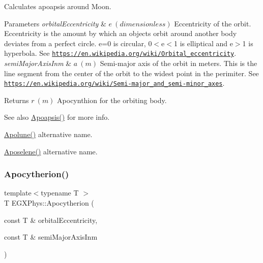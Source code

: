 Calculates apoapsis around Moon. 


\begin{DoxyParams}{Parameters}
{\em orbital\+Eccentricity} & $ e\ (dimensionless)$ Eccentricity of the orbit. Eccentricity is the amount by which an objects orbit around another body deviates from a perfect circle. e=0 is circular, 0$<$e$<$1 is elliptical and e$>$1 is hyperbola. See \href{https://en.wikipedia.org/wiki/Orbital_eccentricity}{\tt https\+://en.\+wikipedia.\+org/wiki/\+Orbital\+\_\+eccentricity}. \\
\hline
{\em semi\+Major\+Axis\+Inm} & $ a\ (m)$ Semi-\/major axis of the orbit in meters. This is the line segment from the center of the orbit to the widest point in the perimiter. See \href{https://en.wikipedia.org/wiki/Semi-major_and_semi-minor_axes}{\tt https\+://en.\+wikipedia.\+org/wiki/\+Semi-\/major\+\_\+and\+\_\+semi-\/minor\+\_\+axes}. \\
\hline
\end{DoxyParams}
\begin{DoxyReturn}{Returns}
$ r\ (m)$ Apocynthion for the orbiting body. 
\end{DoxyReturn}
\begin{DoxySeeAlso}{See also}
\mbox{\hyperlink{group___e_g_x_phys-_apoapsis_gafd08a2d1d64886e7bb9bcb7ff65bc3ea}{Apoapsis()}} for more info. 

\mbox{\hyperlink{group___e_g_x_phys-_apoapsis_gac82e5aebcf63e5113ddefe648f40ef2e}{Apolune()}} alternative name. 

\mbox{\hyperlink{group___e_g_x_phys-_apoapsis_gaf13528a3ed48f6e85f4ba5735edc1163}{Aposelene()}} alternative name. 
\end{DoxySeeAlso}
\mbox{\label{group___e_g_x_phys-_apoapsis_ga75bd80071f792bd75d609fec8dca17b1}} 
\subsubsection{\texorpdfstring{Apocytherion()}{Apocytherion()}}
{\footnotesize\ttfamily template$<$typename T $>$ \\
T E\+G\+X\+Phys\+::\+Apocytherion (\begin{DoxyParamCaption}\item[{const T \&}]{orbital\+Eccentricity,  }\item[{const T \&}]{semi\+Major\+Axis\+Inm }\end{DoxyParamCaption})}



